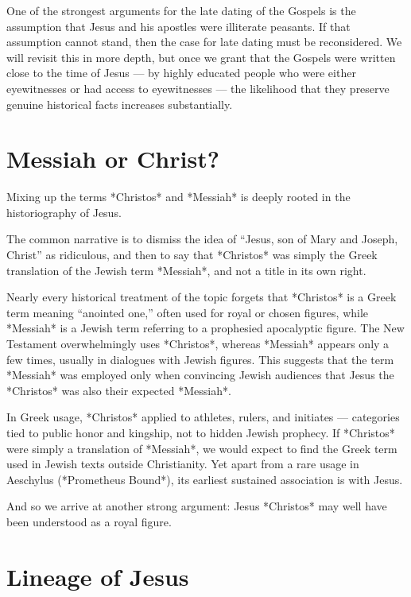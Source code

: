 One of the strongest arguments for the late dating of the Gospels is the assumption that Jesus and his apostles were illiterate peasants.
If that assumption cannot stand, then the case for late dating must be reconsidered.
We will revisit this in more depth, but once we grant that the Gospels were written close to the time of Jesus — by highly educated people who were either eyewitnesses or had access to eyewitnesses — the likelihood that they preserve genuine historical facts increases substantially.

\section{Messiah or Christ?}\label{sec:messiah-or-christ}

Mixing up the terms *Christos* and *Messiah* is deeply rooted in the historiography of Jesus.

The common narrative is to dismiss the idea of “Jesus, son of Mary and Joseph, Christ” as ridiculous, and then to say that *Christos* was simply the Greek translation of the Jewish term *Messiah*, and not a title in its own right.

Nearly every historical treatment of the topic forgets that *Christos* is a Greek term meaning “anointed one,” often used for royal or chosen figures, while *Messiah* is a Jewish term referring to a prophesied apocalyptic figure.
The New Testament overwhelmingly uses *Christos*, whereas *Messiah* appears only a few times, usually in dialogues with Jewish figures.
This suggests that the term *Messiah* was employed only when convincing Jewish audiences that Jesus the *Christos* was also their expected *Messiah*.

In Greek usage, *Christos* applied to athletes, rulers, and initiates — categories tied to public honor and kingship, not to hidden Jewish prophecy.
If *Christos* were simply a translation of *Messiah*, we would expect to find the Greek term used in Jewish texts outside Christianity.
Yet apart from a rare usage in Aeschylus (*Prometheus Bound*), its earliest sustained association is with Jesus.

And so we arrive at another strong argument: Jesus *Christos* may well have been understood as a royal figure.

\section{Lineage of Jesus}\label{sec:lineage-of-jesus}

